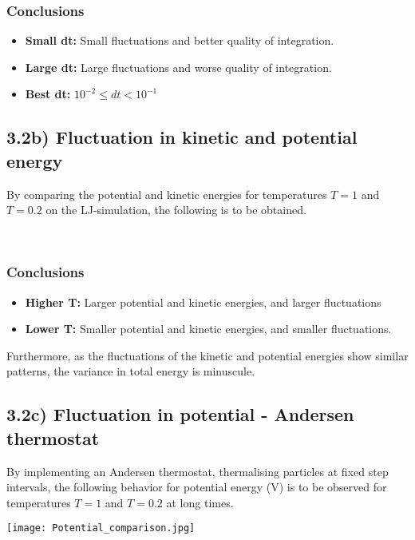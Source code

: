 \documentclass[12pt]{article}
\begin{document}
\subsubsection*{Conclusions}
\begin{itemize}
  \item \textbf{Small dt:} Small fluctuations and better quality of integration.
  \item \textbf{Large dt:} Large fluctuations and worse quality of integration.
  \item \textbf{Best dt:} $10^{-2 } \leq dt < 10^{-1}$
\end{itemize}

\subsection*{3.2b) Fluctuation in kinetic and potential energy}
By comparing the potential and kinetic energies for temperatures $T = 1$ and 
$T = 0.2$ on the LJ-simulation, the following is to be obtained.
\begin{figure*}[ht!]
\begin{center}
   \\
   \caption{\label{workflow} (a) Potential energy (b) Kinetic energy}
\end{center}
\end{figure*}

\subsubsection*{Conclusions}
\begin{itemize}
  \item \textbf{Higher T:} Larger potential and kinetic energies, and larger fluctuations
  \item \textbf{Lower T:} Smaller potential and kinetic energies, and smaller fluctuations.
\end{itemize}
Furthermore, as the fluctuations of the kinetic and potential energies show similar patterns, the variance in total energy is minuscule.


\newpage 

\subsection*{3.2c) Fluctuation in potential - Andersen thermostat}
By implementing an Andersen thermostat, thermalising particles at fixed step intervals, the following behavior for potential energy (V) is to be observed for temperatures $T = 1$ and $T = 0.2$ at long times.
\begin{figure*}[ht!]
\begin{center}
    \texttt{[image: Potential\_comparison.jpg]}
 \caption{Potential ($V$) for $T$ = 0.2 and $T$ = 1}
\end{center}
\end{figure*}
\end{document}
